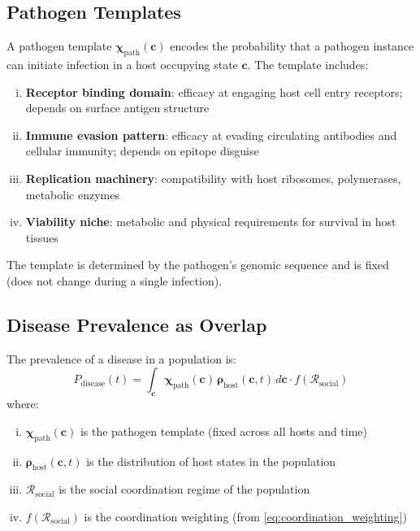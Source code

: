 \documentclass[11pt,twocolumn,a4paper]{article}
\newcommand{\Template}{\boldsymbol{\chi}}
\newcommand{\State}{\boldsymbol{\rho}}
\newcommand{\Coord}{\mathcal{R}}
\begin{document}
\subsection{Pathogen Templates}

\begin{definition}
A pathogen template $\Template_{\mathrm{path}}(\mathbf{c})$ encodes the probability that a pathogen instance can initiate infection in a host occupying state $\mathbf{c}$. The template includes:
\begin{enumerate}[(i)]
\item \textbf{Receptor binding domain}: efficacy at engaging host cell entry receptors; depends on surface antigen structure
\item \textbf{Immune evasion pattern}: efficacy at evading circulating antibodies and cellular immunity; depends on epitope disguise
\item \textbf{Replication machinery}: compatibility with host ribosomes, polymerases, metabolic enzymes
\item \textbf{Viability niche}: metabolic and physical requirements for survival in host tissues
\end{enumerate}
The template is determined by the pathogen's genomic sequence and is fixed (does not change during a single infection).
\end{definition}

\subsection{Disease Prevalence as Overlap}

\begin{theorem}
\label{thm:disease_prev}
The prevalence of a disease in a population is:
\begin{equation}
P_{\mathrm{disease}}(t) = \int_{\mathbf{c}} \Template_{\mathrm{path}}(\mathbf{c}) \, \State_{\mathrm{host}}(\mathbf{c}, t) \, d\mathbf{c} \cdot f(\Coord_{\mathrm{social}})
\label{eq:disease_prevalence}
\end{equation}
where:
\begin{enumerate}[(i)]
\item $\Template_{\mathrm{path}}(\mathbf{c})$ is the pathogen template (fixed across all hosts and time)
\item $\State_{\mathrm{host}}(\mathbf{c}, t)$ is the distribution of host states in the population
\item $\Coord_{\mathrm{social}}$ is the social coordination regime of the population
\item $f(\Coord_{\mathrm{social}})$ is the coordination weighting (from \cref{eq:coordination_weighting})
\end{enumerate}
\end{theorem}
\end{document}

